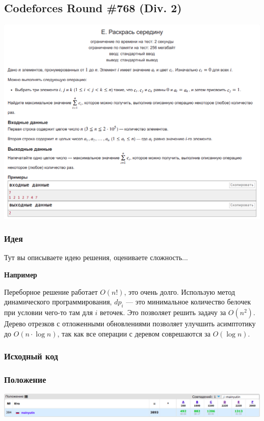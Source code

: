 % 
%

\subsection*{Codeforces Round \#768 (Div. 2)}
\begin{center}
\includegraphics[scale=0.5]{statements/sample-cf.png}
\end{center}
\subsubsection*{Идея}
Тут вы описываете идею решения, оцениваете сложность...

{\bfseries \large Например}

Переборное решение работает $O(n!)$, это очень долго. Использую метод динамического программирования, $dp_i$ --- это минимальное количество белочек при условии чего-то там для $i$ веточек. Это позволяет решить задачу за $O(n ^ 2)$. Дерево отрезков с отложенными обновлениями позволяет улучшить асимптотику до $O(n \cdot \log{n})$, так как все операции с деревом соврешаются за $O(\log{n})$.

\subsubsection*{Исходный код}


\subsubsection*{Положение}
\begin{center}
\includegraphics[scale=0.35]{standings/sample-cf.png}\newline\noindent
\end{center}
\pagebreak

